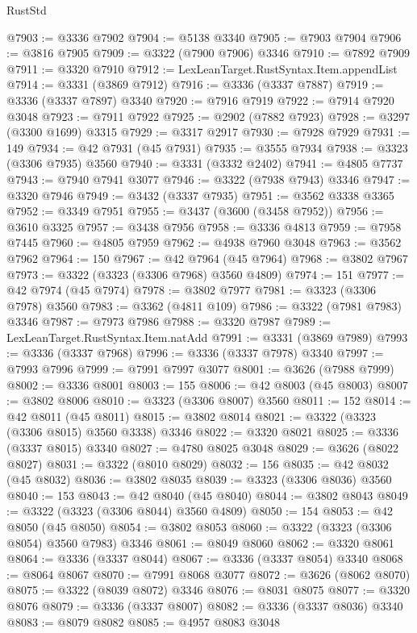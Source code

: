 \begin{lexlean}{RustStd}
\begin{coremodule}
@7903 := @3336 @7902
@7904 := @5138 @3340
@7905 := @7903 @7904
@7906 := @3816 @7905
@7909 := @3322 (@7900 @7906) @3346
@7910 := @7892 @7909
@7911 := @3320 @7910
@7912 := LexLeanTarget.RustSyntax.Item.appendList
@7914 := @3331 (@3869 @7912)
@7916 := @3336 (@3337 @7887)
@7919 := @3336 (@3337 @7897) @3340
@7920 := @7916 @7919
@7922 := @7914 @7920 @3048
@7923 := @7911 @7922
@7925 := @2902 (@7882 @7923)
@7928 := @3297 (@3300 @1699) @3315
@7929 := @3317 @2917
@7930 := @7928 @7929
@7931 := 149
@7934 := @42 @7931 (@45 @7931)
@7935 := @3555 @7934
@7938 := @3323 (@3306 @7935) @3560
@7940 := @3331 (@3332 @2402)
@7941 := @4805 @7737
@7943 := @7940 @7941 @3077
@7946 := @3322 (@7938 @7943) @3346
@7947 := @3320 @7946
@7949 := @3432 (@3337 @7935)
@7951 := @3562 @3338 @3365
@7952 := @3349 @7951
@7955 := @3437 (@3600 (@3458 @7952))
@7956 := @3610 @3325
@7957 := @3438 @7956
@7958 := @3336 @4813
@7959 := @7958 @7445
@7960 := @4805 @7959
@7962 := @4938 @7960 @3048
@7963 := @3562 @7962
@7964 := 150
@7967 := @42 @7964 (@45 @7964)
@7968 := @3802 @7967
@7973 := @3322 (@3323 (@3306 @7968) @3560 @4809)
@7974 := 151
@7977 := @42 @7974 (@45 @7974)
@7978 := @3802 @7977
@7981 := @3323 (@3306 @7978) @3560
@7983 := @3362 (@4811 @109)
@7986 := @3322 (@7981 @7983) @3346
@7987 := @7973 @7986
@7988 := @3320 @7987
@7989 := LexLeanTarget.RustSyntax.Item.natAdd
@7991 := @3331 (@3869 @7989)
@7993 := @3336 (@3337 @7968)
@7996 := @3336 (@3337 @7978) @3340
@7997 := @7993 @7996
@7999 := @7991 @7997 @3077
@8001 := @3626 (@7988 @7999)
@8002 := @3336 @8001
@8003 := 155
@8006 := @42 @8003 (@45 @8003)
@8007 := @3802 @8006
@8010 := @3323 (@3306 @8007) @3560
@8011 := 152
@8014 := @42 @8011 (@45 @8011)
@8015 := @3802 @8014
@8021 := @3322 (@3323 (@3306 @8015) @3560 @3338) @3346
@8022 := @3320 @8021
@8025 := @3336 (@3337 @8015) @3340
@8027 := @4780 @8025 @3048
@8029 := @3626 (@8022 @8027)
@8031 := @3322 (@8010 @8029)
@8032 := 156
@8035 := @42 @8032 (@45 @8032)
@8036 := @3802 @8035
@8039 := @3323 (@3306 @8036) @3560
@8040 := 153
@8043 := @42 @8040 (@45 @8040)
@8044 := @3802 @8043
@8049 := @3322 (@3323 (@3306 @8044) @3560 @4809)
@8050 := 154
@8053 := @42 @8050 (@45 @8050)
@8054 := @3802 @8053
@8060 := @3322 (@3323 (@3306 @8054) @3560 @7983) @3346
@8061 := @8049 @8060
@8062 := @3320 @8061
@8064 := @3336 (@3337 @8044)
@8067 := @3336 (@3337 @8054) @3340
@8068 := @8064 @8067
@8070 := @7991 @8068 @3077
@8072 := @3626 (@8062 @8070)
@8075 := @3322 (@8039 @8072) @3346
@8076 := @8031 @8075
@8077 := @3320 @8076
@8079 := @3336 (@3337 @8007)
@8082 := @3336 (@3337 @8036) @3340
@8083 := @8079 @8082
@8085 := @4957 @8083 @3048

\end{coremodule}
\end{lexlean}
